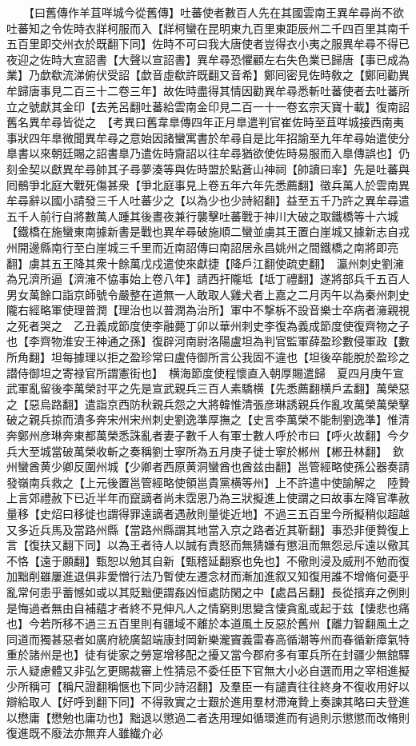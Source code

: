 　　【曰舊傳作羊苴咩城今從舊傳】吐蕃使者數百人先在其國雲南王異牟尋尚不欲吐蕃知之令佐時衣牂柯服而入【牂柯蠻在昆明東九百里東距辰州二千四百里其南千五百里即交州衣於既翻下同】佐時不可曰我大唐使者豈得衣小夷之服異牟尋不得已夜迎之佐時大宣詔書【大聲以宣詔書】異牟尋恐懼顧左右失色業已歸唐【事已成為業】乃歔欷流涕俯伏受詔【歔音虛欷許既翻又音希】鄭囘密見佐時敎之【鄭囘勸異牟歸唐事見二百三十二卷三年】故佐時盡得其情因勸異牟尋悉斬吐蕃使者去吐蕃所立之號獻其金印【去羌呂翻吐蕃給雲南金印見二百一十一卷玄宗天寶十載】復南詔舊名異牟尋皆從之　【考異曰舊韋臯傳四年正月臯遣判官崔佐時至苴咩城接西南夷事狀四年臯微聞異牟尋之意始因諸蠻寓書於牟尋自是比年招諭至九年牟尋始遣使分臯書以來朝廷賜之詔書臯乃遣佐時齎詔以往牟尋猶欲使佐時易服而入臯傳誤也】仍刻金契以獻異牟尋帥其子尋夢湊等與佐時盟於點蒼山神祠【帥讀曰率】先是吐蕃與囘鶻爭北庭大戰死傷甚衆【爭北庭事見上卷五年六年先悉薦翻】徵兵萬人於雲南異牟尋辭以國小請發三千人吐蕃少之【以為少也少詩紹翻】益至五千乃許之異牟尋遣五千人前行自將數萬人踵其後晝夜兼行襲擊吐蕃戰于神川大破之取鐵橋等十六城【鐵橋在施蠻東南據新書是戰也異牟尋破施順二蠻並虜其王置白崖城又據新志自戎州開邊縣南行至白崖城三千里而近南詔傳曰南詔居永昌姚州之間鐵橋之南將即亮翻】虜其五王降其衆十餘萬戊戍遣使來獻捷【降戶江翻使疏吏翻】　瀛州刺史劉澭為兄濟所逼【濟澭不恊事始上卷八年】請西扞隴坻【坻丁禮翻】遂將部兵千五百人男女萬餘口詣京師號令嚴整在道無一人敢取人雞犬者上嘉之二月丙午以為秦州刺史隴右經略軍使理普潤【理治也以普潤為治所】軍中不撃柝不設音樂士卒病者澭親視之死者哭之　乙丑義成節度使李融薨丁卯以華州刺史李復為義成節度使復齊物之子也【李齊物淮安王神通之孫】復辟河南尉洛陽盧坦為判官監軍薛盈珍數侵軍政【數所角翻】坦每據理以拒之盈珍常曰盧侍御所言公我固不違也【坦後卒能脫於盈珍之譛侍御坦之寄禄官所謂憲街也】　横海節度使程懷直入朝厚賜遣歸　夏四月庚午宣武軍亂留後李萬榮討平之先是宣武親兵三百人素驕横【先悉薦翻横戶孟翻】萬榮惡之【惡烏路翻】遣詣京西防秋親兵怨之大將韓惟清張彦琳誘親兵作亂攻萬榮萬榮擊破之親兵掠而潰多奔宋州宋州刺史劉逸準厚撫之【史言李萬榮不能制劉逸準】惟清奔鄭州彦琳奔東都萬榮悉誅亂者妻子數千人有軍士數人呼於市曰【呼火故翻】今夕兵大至城當破萬榮收斬之奏稱劉士寧所為五月庚子徙士寧於郴州【郴丑林翻】　欽州蠻酋黄少卿反圍州城【少卿者西原黄洞蠻酋也酋兹由翻】邕管經略使孫公器奏請發嶺南兵救之【上元後置邕管經略使領邕貴黨横等州】上不許遣中使諭解之　陸贄上言郊禮赦下已近半年而竄謫者尚未霑恩乃為三狀擬進上使謂之曰故事左降官準赦量移【史炤曰移徙也謂得罪遠謫者遇赦則量徙近地】不過三五百里今所擬稍似超越又多近兵馬及當路州縣【當路州縣謂其地當入京之路者近其靳翻】事恐非便贄復上言【復扶又翻下同】以為王者待人以誠有責怒而無猜嫌有懲沮而無怨忌斥遠以儆其不恪【遠于願翻】甄恕以勉其自新【甄稽延翻察也免也】不儆則浸及威刑不勉而復加黜削雖屢進退俱非愛憎行法乃暫使左遷念材而漸加進叙又知復用誰不增脩何憂乎亂常何患乎蓄憾如或以其貶黜便謂姦凶恒處防閑之中【處昌呂翻】長從擯弃之例則是悔過者無由自補蘊才者終不見伸凡人之情窮則思變含悽貪亂或起于兹【悽悲也痛也】今若所移不過三五百里則有疆域不離於本道風土反惡於舊州【離力智翻風土之同道而獨甚惡者如廣府統廣韶端康封岡新樂瀧竇義雷春高循潮等州而春循新瘴氣特重於諸州是也】徒有徙家之勞寔增移配之擾又當今郡府多有軍兵所在封疆少無舘驛示人疑慮體又非弘乞更賜裁審上性猜忌不委任臣下官無大小必自選而用之宰相進擬少所稱可【稱尺證翻稱愜也下同少詩沼翻】及羣臣一有譴責往往終身不復收用好以辯給取人【好呼到翻下同】不得敦實之士艱於進用羣材滯淹贄上奏諫其略曰夫登進以懋庸【懋勉也庸功也】黜退以懲過二者迭用理如循環進而有過則示懲懲而改脩則復進既不廢法亦無弃人雖纎介必
